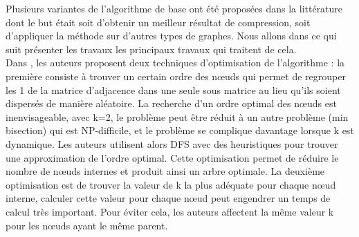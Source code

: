 Plusieurs variantes de l'algorithme de base ont été proposées dans la littérature dont le but était soit d'obtenir un meilleur résultat de compression, soit d'appliquer la méthode sur d'autres types de graphes. Nous allons dans ce qui suit présenter les travaux les principaux travaux qui traitent de cela.\\

Dans \citep{shi2012optimizing}, les auteurs proposent deux techniques d'optimisation de l'algorithme : la première consiste à trouver un certain ordre des nœuds qui permet de regrouper les 1 de la matrice d'adjacence dans une seule sous matrice au lieu qu'ils soient dispersés de manière aléatoire. La recherche d'un ordre optimal des nœuds est inenvisageable, avec k=2, le problème peut être réduit à un autre problème (min bisection) qui est NP-difficile, et le problème se complique davantage lorsque k est dynamique. Les auteurs utilisent alors DFS avec des heuristiques pour trouver une approximation de l'ordre optimal. Cette optimisation permet de réduire le nombre de nœuds internes et produit ainsi un arbre optimale. La deuxième optimisation est de trouver la valeur de k la plus adéquate pour chaque nœud interne, calculer cette valeur pour chaque nœud peut engendrer un temps de calcul très important. Pour éviter cela, les auteurs affectent la même valeur k pour les nœuds ayant le même parent. 	

